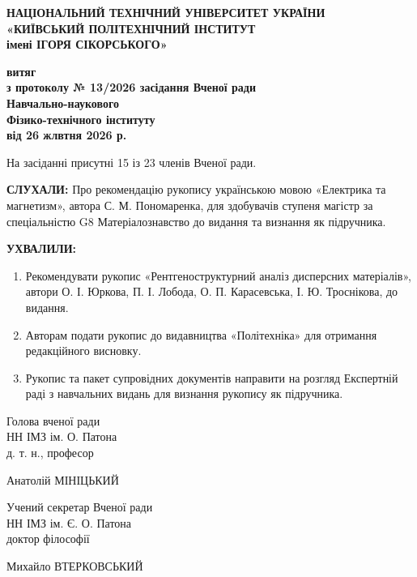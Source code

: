 \documentclass[12pt,a4paper]{article}
\begin{document}
\begin{center}
    \textbf{\large НАЦІОНАЛЬНИЙ ТЕХНІЧНИЙ УНІВЕРСИТЕТ УКРАЇНИ}\\[0.2em]
    \textbf{\large «КИЇВСЬКИЙ ПОЛІТЕХНІЧНИЙ ІНСТИТУТ\\ імені ІГОРЯ СІКОРСЬКОГО»}
\end{center}

\vspace{1.5em}

\begin{center}
    \textbf{\Large витяг}\\[0.3em]
    \textbf{з протоколу № 13/2026 засідання Вченої ради}\\[0.2em]
    \textbf{Навчально-наукового}\\[0.2em]
    \textbf{Фізико-технічного інституту}\\[0.3em]
    \textbf{від 26 жлвтня 2026 р.}
\end{center}

\vspace{1em}

\noindent На засіданні присутні 15 із 23 членів Вченої ради.

\vspace{1.5em}

\noindent \textbf{СЛУХАЛИ:} Про рекомендацію рукопису українською мовою «Електрика та магнетизм», автора С. М. Пономаренка, для здобувачів ступеня магістр за спеціальністю G8 Матеріалознавство до видання та визнання як підручника.

\vspace{1em}

\noindent \textbf{УХВАЛИЛИ:}
\begin{enumerate}
    \item Рекомендувати рукопис «Рентгеноструктурний аналіз дисперсних матеріалів», автори О. І. Юркова, П. І. Лобода, О. П. Карасевська, І. Ю. Троснікова, до видання.
    \item Авторам подати рукопис до видавництва «Політехніка» для отримання редакційного висновку.
    \item Рукопис та пакет супровідних документів направити на розгляд Експертній раді з навчальних видань для визнання рукопису як підручника.
\end{enumerate}

\vspace{3em}

\noindent
\begin{minipage}[t]{0.65\textwidth}
    Голова вченої ради\\
    НН ІМЗ ім. О. Патона\\
    д. т. н., професор
\end{minipage}%
\begin{minipage}[t]{0.35\textwidth}
    \raggedleft
    Анатолій МІНІЦЬКИЙ
\end{minipage}

\vspace{2.5em}

\noindent
\begin{minipage}[t]{0.65\textwidth}
    Учений секретар Вченої ради\\
    НН ІМЗ ім. Є. О. Патона\\
    доктор філософії
\end{minipage}%
\begin{minipage}[t]{0.35\textwidth}
    \raggedleft
    Михайло ВТЕРКОВСЬКИЙ
\end{minipage}
\end{document}
